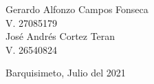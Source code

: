 \begin{titlepage}
\begin{table}[t]
\begin{flushright}
Gerardo Alfonzo Campos Fonseca\\ 
V. 27085179\\
José Andrés Cortez Teran\\
V. 26540824\\

\vspace*{2mm}


\end{flushright}
\vspace*{5mm}

\begin{center}Barquisimeto, Julio del 2021\end{center}
\end{table}
\end{titlepage}

